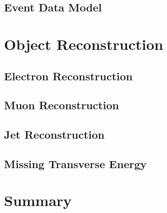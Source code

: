 \subsection{Event Data Model}
\label{ss:edm}


\section{Object Reconstruction}

\subsection{Electron Reconstruction}

\subsection{Muon Reconstruction}

\subsection{Jet Reconstruction}

\subsection{Missing Transverse Energy}

\section{Summary}


